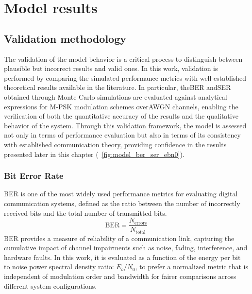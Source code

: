 
\chapter{Model results}
\label{cap:chapter5}

\section{Validation methodology}
\label{sec:validation_methodology}

The validation of the model behavior is a critical process to distinguish between plausible but incorrect results and valid ones.
In this work, validation is performed by comparing the simulated performance metrics with well-established theoretical results available in the literature. In particular, the\gls{BER} and\gls{SER} obtained through Monte Carlo simulations are evaluated against analytical expressions for M-\gls{PSK} modulation schemes over\gls{AWGN} channels, enabling the verification of both the quantitative accuracy of the results and the qualitative behavior of the system.
Through this validation framework, the model is assessed not only in terms of performance evaluation but also in terms of its consistency with established communication theory, providing confidence in the results presented later in this chapter (\figurename~\ref{fig:model_ber_ser_ebn0}).

\subsection{Bit Error Rate}
\label{sec:ber}

\gls{BER} is one of the most widely used performance metrics for evaluating digital communication systems, defined as the ratio between the number of incorrectly received bits and the total number of transmitted bits.
\begin{equation}
    \label{eq:ber_definition}
    \text{BER} = \frac{N_{\text{errors}}}{N_{\text{total}}}
\end{equation}
\gls{BER} provides a measure of reliability of a communication link, capturing the cumulative impact of channel impairments such as noise, fading, interference, and hardware faults. In this work, it is evaluated as a function of the energy per bit to noise power spectral density ratio: $E_b/N_0$, to prefer a normalized metric that is independent of modulation order and bandwidth for fairer comparisons across different system configurations.

